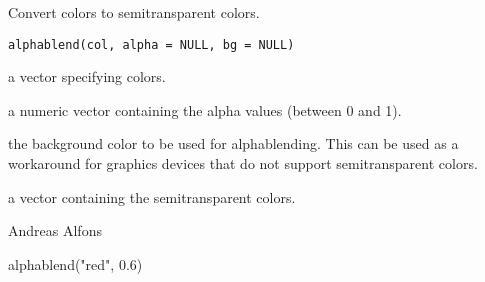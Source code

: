 %
\begin{Description}\relax
Convert colors to semitransparent colors.
\end{Description}
%
\begin{Usage}
\begin{verbatim}
alphablend(col, alpha = NULL, bg = NULL)
\end{verbatim}
\end{Usage}
%
\begin{Arguments}
\begin{ldescription}
\item[\code{col}] a vector specifying colors.
\item[\code{alpha}] a numeric vector containing the alpha values (between 0 
and 1).
\item[\code{bg}] the background color to be used for alphablending.  This can 
be used as a workaround for graphics devices that do not support 
semitransparent colors.
\end{ldescription}
\end{Arguments}
%
\begin{Value}
a vector containing the semitransparent colors.
\end{Value}
%
\begin{Author}\relax
Andreas Alfons
\end{Author}
%
\begin{Examples}
\begin{ExampleCode}
alphablend("red", 0.6)
\end{ExampleCode}
\end{Examples}
